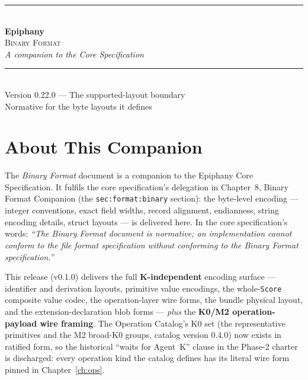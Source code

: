 \documentclass[11pt,letterpaper]{report}
\newcommand{\sectionsc}[1]{{\addfontfeatures{Letters=SmallCaps}#1}}
\begin{document}
\begin{titlepage}
  \thispagestyle{empty}
  \centering
  \vspace*{2.2in}
  {\color{epiphanygold}\rule{3in}{0.8pt}}\\[18pt]
  {\titlefont\fontsize{34pt}{38pt}\selectfont\color{epiphanyteal}\bfseries Epiphany}\\[10pt]
  {\Large\scshape\color{epiphanyslate}Binary Format}\\[6pt]
  {\large\itshape\color{epiphanyslate}A companion to the Core Specification}\\[14pt]
  {\color{epiphanygold}\rule{3in}{0.8pt}}\\[24pt]
  {\normalsize\color{epiphanyink}Version 0.22.0 --- The supported-layout boundary}\\[4pt]
  {\small\color{epiphanyslate}Normative for the byte layouts it defines}
  \vfill
\end{titlepage}

\tableofcontents

\chapter{About This Companion}
\label{ch:about}

The \emph{Binary Format} document is a companion to the Epiphany Core
Specification. It fulfils the core specification's delegation in Chapter~8,
\sectionsc{Binary Format Companion} (the \texttt{sec:format:binary} section):
the byte-level encoding --- integer conventions, exact field widths, record
alignment, endianness, string encoding details, struct layouts --- is delivered
here. In the core specification's words: \emph{``The Binary Format document is
normative; an implementation cannot conform to the file format specification
without conforming to the Binary Format specification.''}

This release (v0.1.0) delivers the full \textbf{K-independent} encoding
surface --- identifier and derivation layouts, primitive value encodings, the
whole-\texttt{Score} composite value codec, the operation-layer wire forms,
the bundle physical layout, and the extension-declaration blob forms ---
\emph{plus} the \textbf{K0/M2 operation-payload wire framing}. The Operation
Catalog's K0 set (the representative primitives and the M2 broad-K0 groups,
catalog version 0.4.0) now exists in ratified form, so the historical ``waits
for Agent~K'' clause in the Phase-2 charter is discharged: every operation
kind the catalog defines has its literal wire form pinned in
Chapter~\ref{ch:ops}.
\end{document}

